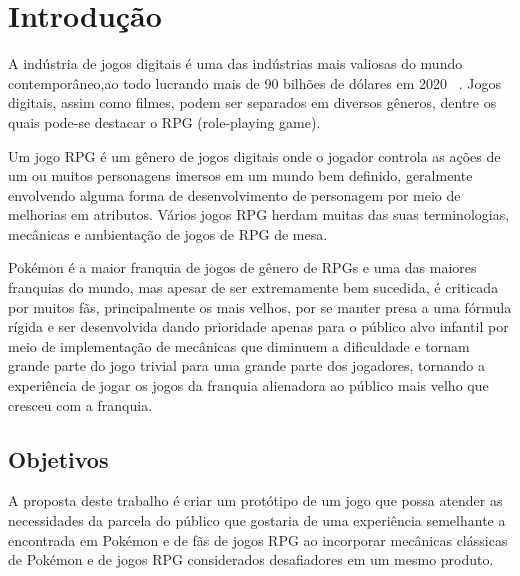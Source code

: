\documentclass[
	12pt,				%
	openright,			%
	twoside,			%
	a4paper,			%
	english,			%
	french,				%
	spanish,			%
	brazil				%
	]{abntex2}
\begin{document}
\tableofcontents*
\cleardoublepage



\textual

\chapter{Introdução}

A indústria de jogos digitais é uma das indústrias mais valiosas do mundo contemporâneo,ao todo lucrando mais de 90 bilhões de dólares em 2020 ~\cite{Techjury}. Jogos digitais, assim como filmes, podem ser separados em diversos gêneros, dentre os quais pode-se destacar o RPG (role-playing game).

Um jogo RPG é um gênero de jogos digitais onde o jogador controla as ações de um ou muitos personagens imersos em um mundo bem definido, geralmente envolvendo alguma forma de desenvolvimento de personagem por meio de melhorias em atributos. Vários jogos RPG herdam muitas das suas terminologias, mecânicas e ambientação de jogos de RPG de mesa. ~\cite{Wiki01}
	
Pokémon é a maior franquia de jogos de gênero de RPGs e uma das maiores franquias do mundo, mas apesar de ser extremamente bem sucedida, é criticada por muitos fãs, principalmente os mais velhos, por se manter presa a uma fórmula rígida e ser desenvolvida dando prioridade apenas para o público alvo infantil por meio de implementação de mecânicas que diminuem a dificuldade e tornam grande parte do jogo trivial para uma grande parte dos jogadores, tornando a experiência de jogar os jogos da franquia alienadora ao público mais velho que cresceu com a franquia.


\section{Objetivos}

A proposta deste trabalho é criar um protótipo de um jogo que possa atender as necessidades da parcela do público que gostaria de uma experiência semelhante a encontrada em Pokémon e de fãs de jogos RPG ao incorporar mecânicas clássicas de Pokémon e de jogos RPG considerados desafiadores em um mesmo produto.
\end{document}
